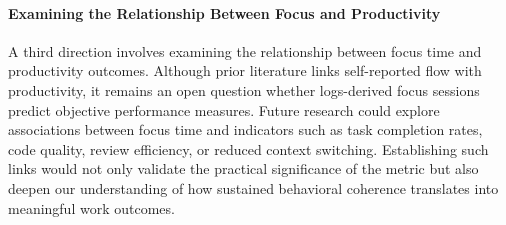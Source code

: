 \paragraph{Examining the Relationship Between Focus and Productivity}
A third direction involves examining the relationship between focus time and productivity outcomes. Although prior literature links self-reported flow with productivity, it remains an open question whether logs-derived focus sessions predict objective performance measures. Future research could explore associations between focus time and indicators such as task completion rates, code quality, review efficiency, or reduced context switching. Establishing such links would not only validate the practical significance of the metric but also deepen our understanding of how sustained behavioral coherence translates into meaningful work outcomes.
